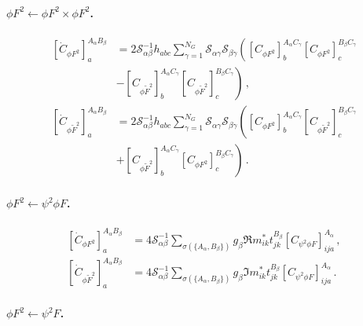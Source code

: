 \paragraph{\texorpdfstring{$\phi F^2\leftarrow \phi F^2\times\phi F^2$}{phiF2fromphiF2xphiF2}.}
\label{par:phiF2<-phiF2xphiF2}

\begin{align}
    \left[\dot C_{\phi F^2}\right]^{A_\alpha B_\beta}_a &= 
    2 \mathcal S_{\alpha\beta}^{-1}h_{abc}\sum_{\gamma=1}^{N_G}\mathcal S_{\alpha\gamma}\mathcal S_{\beta\gamma}
    \left(
    \left[ C_{\phi F^2}\right]^{A_\alpha C_\gamma}_b  \left[ C_{\phi F^2}\right]^{B_\beta C_\gamma}_c
    \right.\nonumber \\ & \left.- \left[ C_{\phi \widetilde F^2}\right]^{A_\alpha C_\gamma}_b  \left[ C_{\phi \widetilde F^2}\right]^{B_\beta C_\gamma}_c
    \right)\,,\label{eq:phiF2-phiF2xphiF2}
    \\
    \left[\dot C_{\phi \widetilde F^2}\right]^{A_\alpha B_\beta}_a &= 
    2 \mathcal S_{\alpha\beta}^{-1}h_{abc}\sum_{\gamma=1}^{N_G}\mathcal S_{\alpha\gamma}\mathcal S_{\beta\gamma}
    \left(
    \left[ C_{\phi F^2}\right]^{A_\alpha C_\gamma}_b  \left[ C_{\phi \widetilde F^2}\right]^{B_\beta C_\gamma}_c
    \right.\nonumber \\ & \left.+ \left[ C_{\phi \widetilde F^2}\right]^{A_\alpha C_\gamma}_b  \left[ C_{\phi  F^2}\right]^{B_\beta C_\gamma}_c
    \right)\,.
\end{align}

\paragraph{$\phi F^2 \leftarrow \psi^2 \phi F$.}

\begin{align}
    \left[\dot C_{\phi F^2}\right]_{a}^{A_\alpha B_\beta} &= 4 \mathcal S_{\alpha\beta}^{-1} \sum_{\sigma(\{A_\alpha,B_\beta\})}
     g_\beta \Re{
     m^*_{ik}t^{B_\beta}_{jk}
    \left[C_{\psi^2\phi F}\right]_{ija}^{A_\alpha}
    }
    \,,\label{phiF2_psi2phiF}
    \\
    \left[\dot C_{\phi \widetilde F^2}\right]_{a}^{A_\alpha B_\beta} &= 4 \mathcal S_{\alpha\beta}^{-1} \sum_{\sigma(\{A_\alpha,B_\beta\})}
     g_\beta \Im{
     m^*_{ik}t^{B_\beta}_{jk}
    \left[C_{\psi^2\phi F}\right]_{ija}^{A_\alpha}
    }
    \,.\label{phiFtilde2_psi2phiF}
\end{align}

\paragraph{$\phi F^2 \leftarrow \psi^2 F$.}

